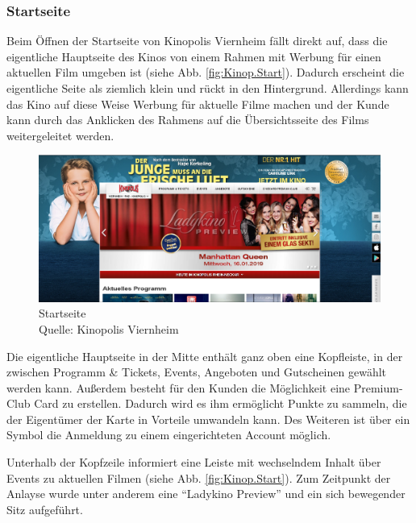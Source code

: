 	\subsubsection{Startseite}
	Beim Öffnen der Startseite von Kinopolis Viernheim fällt direkt auf, dass die eigentliche Hauptseite des Kinos von einem Rahmen mit Werbung für einen aktuellen Film umgeben ist (siehe Abb. \vref{fig:Kinop.Start}). Dadurch erscheint die eigentliche Seite als ziemlich klein und rückt in den Hintergrund. Allerdings kann das Kino auf diese Weise Werbung für aktuelle Filme machen und der Kunde kann durch das Anklicken des Rahmens  auf die Übersichtsseite des Films weitergeleitet werden. 
	\begin{figure}[H]
		\centering 
		\includegraphics[width=14cm]{img/Kinopolis_MA_Startseite.png}
		\captionsetup{format=hang}
		\centering\caption[Startseite von Kinopolis Viernheim]{\label{fig:Kinop.Start}Startseite \\Quelle: Kinopolis Viernheim}
	\end{figure} 
	
	Die eigentliche Hauptseite in der Mitte enthält ganz oben eine Kopfleiste, in der zwischen Programm \& Tickets, Events, Angeboten und Gutscheinen gewählt werden kann. Außerdem besteht für den Kunden die Möglichkeit eine Premium-Club Card zu erstellen. Dadurch wird es ihm ermöglicht Punkte zu sammeln, die der Eigentümer der Karte in Vorteile umwandeln kann. Des Weiteren ist über ein Symbol die Anmeldung zu einem eingerichteten Account möglich. 
	
	Unterhalb der Kopfzeile informiert eine Leiste mit wechselndem Inhalt über Events zu aktuellen Filmen (siehe Abb. \vref{fig:Kinop.Start}). Zum Zeitpunkt der Anlayse wurde unter anderem eine \enquote{Ladykino Preview} und ein sich bewegender Sitz aufgeführt. 
	

